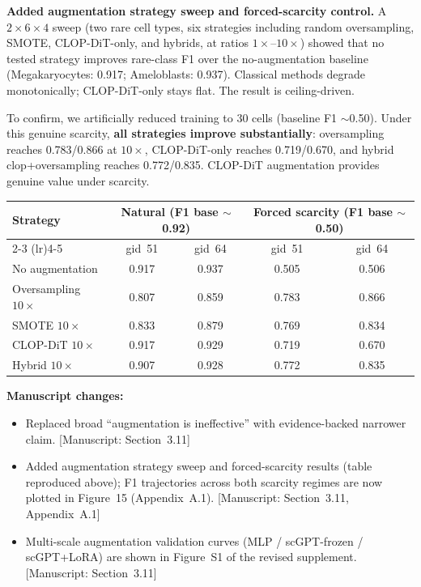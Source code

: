 \documentclass[11pt,letterpaper]{article}
\newcommand{\msref}[1]{\textcolor{blue!60!black}{\textsf{[Manuscript: #1]}}}
\begin{document}
\begin{revisionupdate}
\textbf{Added augmentation strategy sweep and forced-scarcity control.}
A $2 \times 6 \times 4$ sweep (two rare cell types, six strategies including random oversampling, SMOTE, CLOP-DiT-only, and hybrids, at ratios $1\times$--$10\times$) showed that no tested strategy improves rare-class F1 over the no-augmentation baseline (Megakaryocytes: 0.917; Ameloblasts: 0.937). Classical methods degrade monotonically; CLOP-DiT-only stays flat. The result is ceiling-driven.

To confirm, we artificially reduced training to 30 cells (baseline F1 $\sim$0.50). Under this genuine scarcity, \textbf{all strategies improve substantially}: oversampling reaches 0.783/0.866 at $10\times$, CLOP-DiT-only reaches 0.719/0.670, and hybrid clop+oversampling reaches 0.772/0.835. CLOP-DiT augmentation provides genuine value under scarcity.

\medskip
\begin{tabular}{@{}lcccc@{}}
\toprule
\textbf{Strategy} & \multicolumn{2}{c}{\textbf{Natural (F1 base $\sim$0.92)}} & \multicolumn{2}{c}{\textbf{Forced scarcity (F1 base $\sim$0.50)}} \\
\cmidrule(lr){2-3} \cmidrule(lr){4-5}
 & gid~51 & gid~64 & gid~51 & gid~64 \\
\midrule
No augmentation & 0.917 & 0.937 & 0.505 & 0.506 \\
Oversampling $10\times$ & 0.807 & 0.859 & 0.783 & 0.866 \\
SMOTE $10\times$ & 0.833 & 0.879 & 0.769 & 0.834 \\
CLOP-DiT $10\times$ & 0.917 & 0.929 & 0.719 & 0.670 \\
Hybrid $10\times$ & 0.907 & 0.928 & 0.772 & 0.835 \\
\bottomrule
\end{tabular}
\end{revisionupdate}

\noindent\textbf{Manuscript changes:}
\begin{itemize}
  \item Replaced broad ``augmentation is ineffective'' with evidence-backed narrower claim. \msref{Section~3.11}
  \item Added augmentation strategy sweep and forced-scarcity results (table reproduced above); F1 trajectories across both scarcity regimes are now plotted in Figure~15 (Appendix~A.1). \msref{Section~3.11, Appendix~A.1}
  \item Multi-scale augmentation validation curves (MLP / scGPT-frozen / scGPT+LoRA) are shown in Figure~S1 of the revised supplement. \msref{Section~3.11}
\end{itemize}
\end{document}
